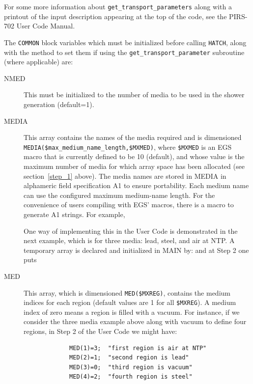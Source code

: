For some more information about {\tt get\_transport\_parameters} along
with a printout of the input description appearing at the top of
the code, see the PIRS-702 User Code Manual\cite{Ro03}.

The {\tt COMMON} block variables which must be initialized before calling
{\tt HATCH}, along with the method to set them if using the
{\tt get\_transport\_parameter} subroutine (where applicable) are:
\begin{description}
\item[NMED]  This must be initialized to the number of media to be used in
the shower generation (default=1).


\item[MEDIA] This array contains the names of the media required and
is dimensioned\\
{\tt MEDIA(\$max\_medium\_name\_length,\$MXMED)}, where {\tt \$MXMED}
is an EGS
macro that is currently defined to be 10 (default), and whose value is
the maximum number of media for which array space has been allocated
(see section~\ref{step_1} above).  The media names are stored in MEDIA in
alphameric field specification A1 to ensure portability.  Each medium name
can use the configured maximum medium-name length.  For the convenience
of users compiling with EGS'
macros, there is a macro to generate A1 strings.  For example, 
 

One way of implementing this in the User Code is demonstrated in the next
example, which is for three media: lead, steel, and air at NTP.  A
temporary array is declared and initialized in MAIN by:
and at Step 2 one puts

\item[MED] This array, which is dimensioned {\tt MED(\$MXREG)}, contains the
medium indices for each region (default values are 1 for all {\tt \$MXREG}).  A
medium index of zero means a region is filled with a vacuum. For instance,
if we consider the three media example above along with vacuum to define
four regions, in Step 2 of the User Code we might have:
\begin{verbatim}
             MED(1)=3;  "first region is air at NTP"
             MED(2)=1;  "second region is lead"
             MED(3)=0;  "third region is vacuum"
             MED(4)=2;  "fourth region is steel"
\end{verbatim}


\end{description}
